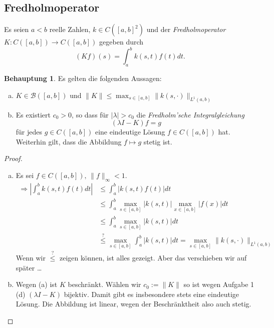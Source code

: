 \documentclass[ngerman]{article}
\theoremstyle{definition}%
\newtheorem*{beh}{Behauptung}
\newcommand{\B}{\mathcal{B}} %
\newcommand{\abs}[1]{\left\lvert #1 \right\rvert }
\newcommand{\df}{\Rightarrow} %
\renewcommand{\{ }{\left\lbrace}
\renewcommand{\}}{\right\rbrace}
\begin{document}
\subsection{Fredholmoperator}
	Es seien $a<b$ reelle Zahlen, $k\in C([a,b]^2)$ und der \textit{Fredholmoperator} $K:C([a,b]) \to C([a,b])$ gegeben durch 	
	$$ (Kf)(s) = \int^b_a k(s,t)f(t) dt.$$
	\begin{beh}
		Es gelten die folgenden Aussagen:
		\begin{enumerate}[(a)]
			\item $K\in \B([a,b])$ und $\| K \| \leq \max_{s\in[a,b]}\|k(s,\cdot) \|_{L^1(a,b)}$
			\item Es existiert $c_0 > 0$, so dass für $|\lambda| > c_0$ die \textit{Fredholm'sche Integralgleichung}
			$$(\lambda I - K)f = g$$
			für jedes $g \in C([a,b])$ eine eindeutige Lösung $f\in C([a,b])$ hat. Weiterhin gilt, dass die Abbildung $f\mapsto g$ stetig ist.
		\end{enumerate}
	\end{beh}
	\begin{proof}
		\begin{enumerate}[(a)]
		\item Es sei $f \in C([a,b]),\, \|f\|_{\infty} < 1$.
		\begin{equation*}
		\begin{split}
		\df \abs{\int^b_a k(s,t)f(t) dt} 
		& \leq \int^b_a \abs{k(s,t)f(t)} dt 
		\\ & \leq \int^b_a \max_{s\in [a,b]} |k(s,t)| \max_{x\in[a,b]} |f(x)| dt 
		\\ & \leq \int^b_a \max_{s\in [a,b]} |k(s,t)| dt
		\\ & \overset{?}{\leq} \max_{s\in [a,b]} \int^b_a |k(s,t)|dt = \max_{s\in[a,b]} \| k(s,\cdot) \|_{L^1(a,b)}
		\end{split}
		\end{equation*}
		Wenn wir $\overset{?}{\leq}$ zeigen können, ist alles gezeigt. Aber das verschieben wir auf später \dots
		
		\item Wegen (a) ist $K$ beschränkt. Wählen wir $c_0 := \|K\|$ so ist wegen Aufgabe 1 (d) $(\lambda I - K)$ bijektiv. Damit gibt es insbesondere stets eine eindeutige Lösung. Die Abbildung ist linear, wegen der Beschränktheit also auch stetig. 		
		
		\end{enumerate}
	\end{proof}
\end{document}
